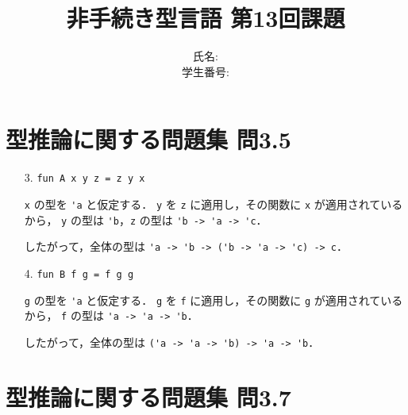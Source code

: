 \documentclass[a4paper, lualatex, ja=standard]{bxjsarticle}
\title{非手続き型言語 第13回課題}
\author{氏名:  \\ 学生番号: }
\begin{document}
\maketitle

\section{型推論に関する問題集 問3.5}

\begin{enumerate}
\item[3.] \verb|fun A x y z = z y x|

  \verb|x| の型を \verb|'a| と仮定する．
  \verb|y| を \verb|z| に適用し，その関数に \verb|x| が適用されているから，
  \verb|y| の型は \verb|'b|，\verb|z| の型は \verb|'b -> 'a -> 'c|．

  したがって，全体の型は \verb|'a -> 'b -> ('b -> 'a -> 'c) -> c|．

\item[4.] \verb|fun B f g = f g g|

\verb|g| の型を \verb|'a| と仮定する．
\verb|g| を \verb|f| に適用し，その関数に \verb|g| が適用されているから，
\verb|f| の型は \verb|'a -> 'a -> 'b|．

したがって，全体の型は \verb|('a -> 'a -> 'b) -> 'a -> 'b|．
\end{enumerate}

\section{型推論に関する問題集 問3.7}
\end{document}
